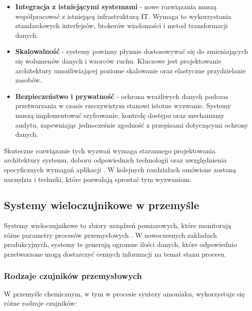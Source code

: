 \begin{itemize}
    \item \textbf{Integracja z istniejącymi systemami} - nowe rozwiązania muszą współpracować z istniejącą infrastrukturą IT. Wymaga to wykorzystania standardowych interfejsów, brokerów wiadomości i metod transformacji danych.
    
    \item \textbf{Skalowalność} - systemy powinny płynnie dostosowywać się do zmieniających się wolumenów danych i wzorców ruchu. Kluczowe jest projektowanie architektury umożliwiającej poziome skalowanie oraz elastyczne przydzielanie zasobów.
    
    \item \textbf{Bezpieczeństwo i prywatność} - ochrona wrażliwych danych podczas przetwarzania w czasie rzeczywistym stanowi istotne wyzwanie. Systemy muszą implementować szyfrowanie, kontrolę dostępu oraz mechanizmy audytu, zapewniając jednocześnie zgodność z przepisami dotyczącymi ochrony danych.
\end{itemize}

Skuteczne rozwiązanie tych wyzwań wymaga starannego projektowania architektury systemu, doboru odpowiednich technologii oraz uwzględnienia specyficznych wymagań aplikacji \cite{geeksforgeeks_realtime}. W kolejnych rozdziałach omówione zostaną narzędzia i techniki, które pozwalają sprostać tym wyzwaniom.

\subsection{Systemy wieloczujnikowe w przemyśle}
\label{subsec:systemy_wieloczujnikowe}

Systemy wieloczujnikowe to zbiory urządzeń pomiarowych, które monitorują różne parametry procesów przemysłowych \citep{multisensor_systems}.
W nowoczesnych zakładach produkcyjnych, systemy te generują ogromne ilości danych, które odpowiednio przetworzone mogą
dostarczyć cennych informacji na temat stanu procesu.

\subsubsection{Rodzaje czujników przemysłowych}
\label{subsubsec:rodzaje_czujnikow}

W przemyśle chemicznym, w tym w procesie syntezy amoniaku, wykorzystuje się różne rodzaje czujników:

